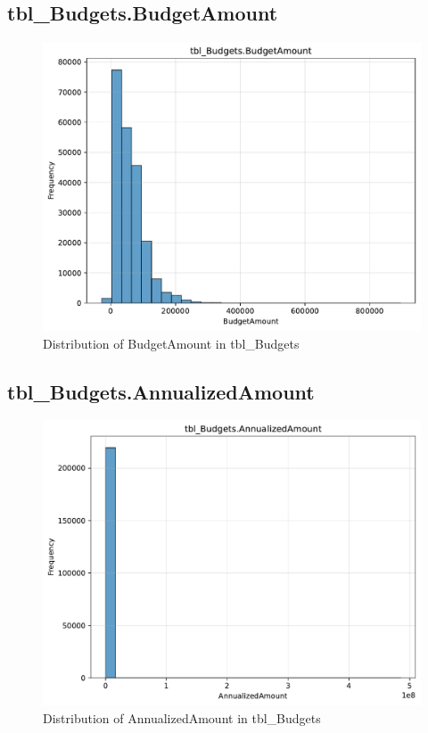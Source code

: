 \subsection{tbl\_Budgets.BudgetAmount}

\begin{figure}[htbp]
\centering
\includegraphics[width=\textwidth]{figures/dbo_tbl_Budgets_BudgetAmount.pdf}
\caption{Distribution of BudgetAmount in tbl\_Budgets}
\end{figure}\newpage

\subsection{tbl\_Budgets.AnnualizedAmount}

\begin{figure}[htbp]
\centering
\includegraphics[width=\textwidth]{figures/dbo_tbl_Budgets_AnnualizedAmount.pdf}
\caption{Distribution of AnnualizedAmount in tbl\_Budgets}
\end{figure}\newpage

